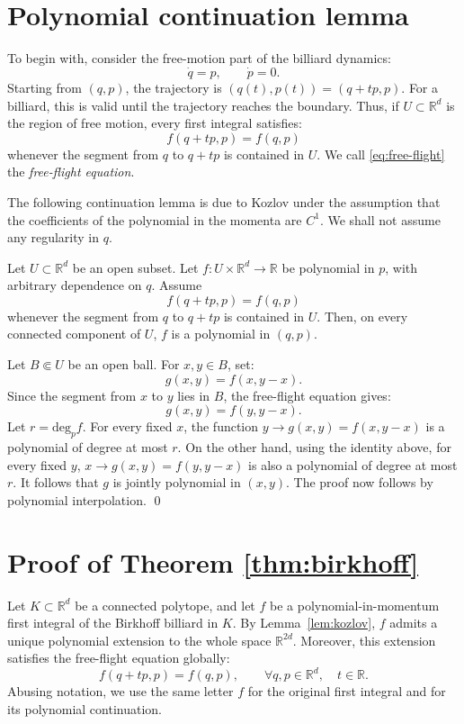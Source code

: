 \documentclass[12pt,reqno]{amsart}
\makeatletter
\renewenvironment{proof}[1][\proofname]{%
  \par\vspace{\topsep}%
  \normalfont\topsep6\p@\@plus6\p@\relax
  \trivlist
  \item[\hskip\labelsep\itshape #1\@addpunct{.}]\ignorespaces
}{%
  \endtrivlist
}
\numberwithin{equation}{section}
\def \R {\mathbb{R}}
\makeatother
\begin{document}
\section{Polynomial continuation lemma}
To begin with, consider the 
free-motion part of the billiard dynamics:
\[
\dot q=p,\qquad \dot p=0.
\]
Starting from \((q,p)\), the trajectory is 
\((q(t),p(t))=(q+tp,p)\). 
For a billiard, this is valid until the trajectory reaches the boundary.
Thus, if \(U\subset\R^d\) is the region of free motion, every first
integral satisfies:
\begin{equation}\label{eq:free-flight}
f(q+tp,p)=f(q,p)
\end{equation}
whenever the segment from \(q\) to \(q+tp\) is contained in \(U\). We call \eqref{eq:free-flight} the \emph{free-flight equation}.
\smallskip%

The following continuation lemma is due to Kozlov \cite{Kozlov} under
the assumption that the coefficients of the polynomial in
the momenta are \(C^1\). We shall not assume any regularity in \(q\).

\begin{lemma}\label{lem:kozlov}
Let \(U\subset\R^d\) be an 
open subset. Let
\(f \colon U\times\R^d\to\R\)
be polynomial in \(p\), with arbitrary dependence on \(q\). Assume
\[
f(q+tp,p)=f(q,p)
\]
whenever the segment from \(q\) to \(q+tp\) is contained in \(U\). Then, on every connected component of \(U\), \(f\) is a polynomial in \((q,p)\).
\end{lemma}
\begin{proof}
Let \(B\Subset U\) be an open 
ball. For \(x,y\in B\), set:
\[
g(x,y)=f(x,y-x).
\]
Since the segment from \(x\) to \(y\) lies in \(B\), the free-flight
equation gives:
\[
g(x,y)=f(y,y-x).
\]
Let \(r=\mathrm{deg}_p f\). For every fixed \(x\), the function 
\(y \to g(x,y)=f(x,y-x)\) 
is a polynomial of degree at most \(r\). On the other hand, using the
identity above, for every 
fixed \(y\), \(x\to g(x,y)=f(y,y-x)\)
is also a polynomial of degree at most \(r\). It follows that \(g\) is jointly polynomial in \((x,y)\). 
The proof now follows by polynomial interpolation. \qed
\end{proof}



\section{Proof of Theorem \ref{thm:birkhoff}} 

Let \(K\subset\R^d\) be a connected polytope, and let \(f\) be a
polynomial-in-momentum first 
integral of the Birkhoff billiard in 
\(K\). By 
Lemma~\ref{lem:kozlov}, \(f\) admits a unique polynomial
extension to the whole space \(\R^{2d}\). Moreover, this extension satisfies the free-flight equation globally:
\[
f(q+tp,p)=f(q,p),
\qquad \forall q, p\in\R^d,\quad t\in\R.
\]
Abusing notation, we use the same letter \(f\) for the original first
integral and for its polynomial  continuation.
\smallskip%
\end{document}
